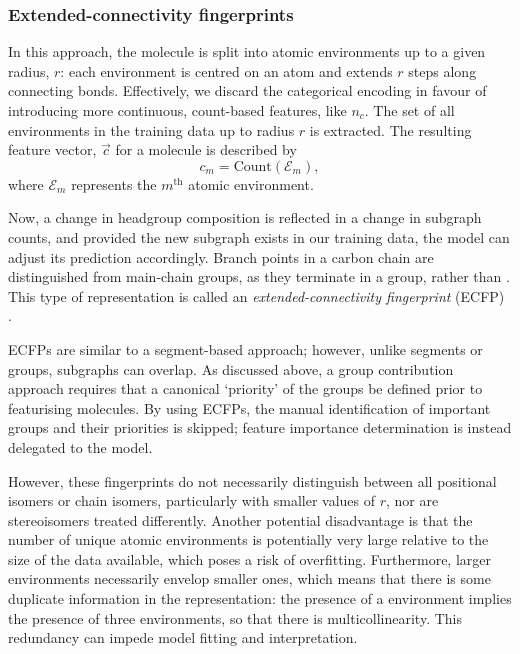 
\subsubsection{Extended-connectivity fingerprints}

In this approach, the molecule is split into atomic environments up to a given
radius, $r$: each environment is centred on an atom and extends $r$ steps along
connecting bonds. Effectively, we discard the categorical encoding in favour of
introducing more continuous, count-based features, like $n_c$. The set of all
environments in the training data up to radius $r$ is extracted. The resulting
feature vector, $\vec{c}$ for a molecule is described by
\begin{equation}
    \label{eq:ecfp}
    c_m = \text{Count}(\mathcal{E}_m),
\end{equation}
where $\mathcal{E}_m$ represents the $m^\text{th}$ atomic environment.

Now, a change in headgroup composition is reflected in a change in subgraph
counts, and provided the new subgraph exists in our training data, the model can
adjust its prediction accordingly. Branch points in a carbon chain are
distinguished from main-chain groups, as they terminate in a  group,
rather than . This type of representation is called an
\emph{extended-connectivity fingerprint} (ECFP)
\cite{rogersExtendedConnectivityFingerprints2010}.

ECFPs are similar to a segment-based approach; however, unlike segments or
groups, subgraphs can overlap. As discussed above, a group contribution approach
requires that a canonical `priority' of the groups be defined prior to
featurising molecules. By using ECFPs, the manual identification of important
groups and their priorities is skipped; feature importance determination is
instead delegated to the model.

However, these fingerprints do not necessarily distinguish between all
positional isomers or chain isomers, particularly with smaller values of $r$,
nor are stereoisomers treated differently. Another potential disadvantage is
that the number of unique atomic environments is potentially very large relative
to the size of the data available, which poses a risk of overfitting.
Furthermore, larger environments necessarily envelop smaller ones, which means
that there is some duplicate information in the representation: the presence of
a  environment implies the presence of three  environments,
so that there is multicollinearity. This redundancy can impede model fitting and
interpretation.

